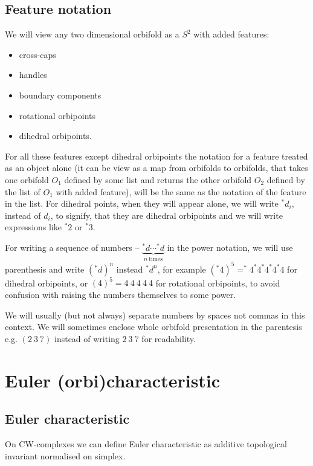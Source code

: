 \subsection{Feature notation}
We will view any two dimensional orbifold as a $S^2$ with added features:
\begin{itemize}
\item cross-caps
\item handles
\item boundary components
\item rotational orbipoints
\item dihedral orbipoints.
\end{itemize}

For all these features except dihedral orbipoints 
the notation for a feature treated as an object alone (it can be view 
as a map from orbifolds to orbifolds, that takes one orbifold $O_1$ defined by some list and 
returns the other orbifold $O_2$ defined by the list of $O_1$ with added feature), will 
be the same as the notation of the feature in the list. For dihedral points, when they will appear 
alone, we will write $^*d_i$, instead of $d_i$, to signify, that they are dihedral orbipoints 
and we will write expressions like $^*2$ or $^*3$. 

For writing a sequence of numbers -- $\underbrace{^*d\cdots ^*d}_{n\ \mathrm{times}}$ 
in the power notation, we will use 
parenthesis and write $(^*d)^n$ instead $^*d^n$, for example 
$(^*4)^5 = ^*4^*4^*4^*4^*4$ for dihedral 
orbipoints, or $(4)^5 = 4\ 4\ 4\ 4\ 4$ for rotational orbipoints, to avoid confusion with 
raising the numbers themselves to some power. 

We will usually (but not always) 
separate numbers by spaces not commas in this context. 
We will sometimes enclose whole orbifold presentation in the parentesis e.g. $(2\ 3\ 7)$ instead 
of writing $2\ 3\ 7$ for readability.

\section{Euler (orbi)characteristic}\label{E_orb}
\label{\Eoc_as_a_sum}
\subsection{Euler characteristic}
On CW-complexes we can define Euler characteristic as additive topological invariant 
normalised on simplex.

